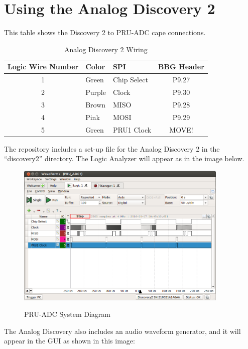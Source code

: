 \chapter{Using the Analog Discovery 2}



This table shows the Discovery 2 to PRU-ADC cape connections.


	\begin{longtable}{cllc}
		\caption{Analog Discovery 2 Wiring}\\
		\toprule
Logic Wire Number & Color & SPI & BBG Header \\\midrule
	1	& Green & Chip Select & P9.27 \\ 
	2	& Purple & Clock & P9.30 \\ 
	3	& Brown & MISO & P9.28 \\ 
	4	& Pink &  MOSI & P9.29 \\ 
	5	& Green & PRU1 Clock & MOVE! \\
	\bottomrule
	\end{longtable}
	
	The repository includes a set-up file for the Analog Discovery 2 in the ``discovery2'' directory.  The Logic Analyzer will appear as in the image below.
	
	\begin{figure}[h]
		\centering
		\includegraphics[width=0.9\textwidth]{photos/discovery2_logic}
		\centering\bfseries
		\caption{PRU-ADC System Diagram}
	\end{figure}
	
	The Analog Discovery also includes an audio waveform generator, and it will appear in the GUI as shown in this image:
	
